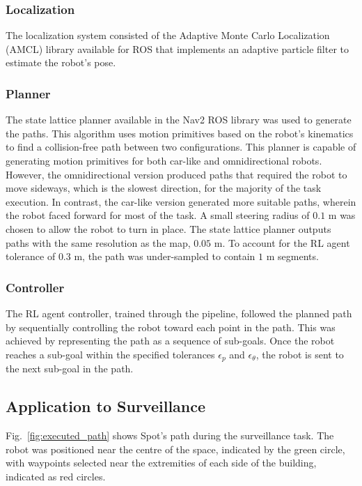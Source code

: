 \subsubsection{Localization}
The localization system consisted of the Adaptive Monte Carlo Localization (AMCL) library available for ROS that implements an adaptive particle filter to estimate the robot's pose.

\subsubsection{Planner}
The state lattice planner available in the Nav2 ROS library was used to generate the paths. This algorithm uses motion primitives based on the robot's kinematics to find a collision-free path between two configurations. This planner is capable of generating motion primitives for both car-like and omnidirectional robots. However, the omnidirectional version produced paths that required the robot to move sideways, which is the slowest direction, for the majority of the task execution. In contrast, the car-like version generated more suitable paths, wherein the robot faced forward for most of the task. A small steering radius of $0.1$ m was chosen to allow the robot to turn in place. The state lattice planner outputs paths with the same resolution as the map, $0.05$ m. To account for the RL agent tolerance of $0.3$ m, the path was under-sampled to contain $1$ m segments.

\subsubsection{Controller}
The RL agent controller, trained through the pipeline, followed the planned path by sequentially controlling the robot toward each point in the path. This was achieved by representing the path as a sequence of sub-goals. Once the robot reaches a sub-goal within the specified tolerances $\epsilon_p$ and $\epsilon_\theta$, the robot is sent to the next sub-goal in the path.

\subsection{Application to Surveillance}

Fig.~\ref{fig:executed_path} shows Spot's path during the surveillance task. The robot was positioned near the centre of the space, indicated by the green circle, with waypoints selected near the extremities of each side of the building, indicated as red circles.

